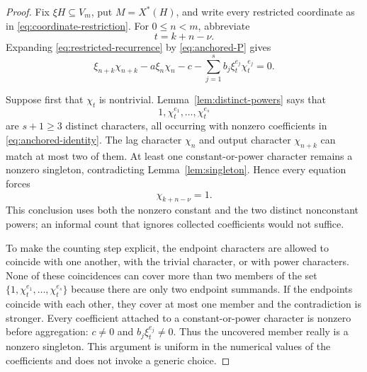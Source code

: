 \documentclass[11pt]{article}
\theoremstyle{definition}
\theoremstyle{remark}
\begin{document}
\begin{proof}
Fix $\xi H\subseteq V_m$, put $M=X^*(H)$, and write every restricted coordinate as in \eqref{eq:coordinate-restriction}.  For $0\leq n<m$, abbreviate
\[
t=k+n-\nu.
\]
Expanding \eqref{eq:restricted-recurrence} by \eqref{eq:anchored-P} gives
\begin{equation}
\xi_{n+k}\chi_{n+k}-a\xi_n\chi_n-c
-\sum_{j=1}^s b_j\xi_t^{e_j}\chi_t^{e_j}=0.
\label{eq:anchored-identity}
\end{equation}

Suppose first that $\chi_t$ is nontrivial.  Lemma~\ref{lem:distinct-powers} says that
\[
1,\chi_t^{e_1},\ldots,\chi_t^{e_s}
\]
are $s+1\geq3$ distinct characters, all occurring with nonzero coefficients in \eqref{eq:anchored-identity}.  The lag character $\chi_n$ and output character $\chi_{n+k}$ can match at most two of them.  At least one constant-or-power character remains a nonzero singleton, contradicting Lemma~\ref{lem:singleton}.  Hence every equation forces
\begin{equation}
\chi_{k+n-\nu}=1.
\label{eq:middle-trivial}
\end{equation}
This conclusion uses both the nonzero constant and the two distinct nonconstant powers; an informal count that ignores collected coefficients would not suffice.

To make the counting step explicit, the endpoint characters are allowed to
coincide with one another, with the trivial character, or with power
characters.  None of these coincidences can cover more than two members of
the set
$\{1,\chi_t^{e_1},\ldots,\chi_t^{e_s}\}$ because there are only two endpoint
summands.  If the endpoints coincide with each other, they cover at most one
member and the contradiction is stronger.  Every coefficient attached to a
constant-or-power character is nonzero before aggregation: $c\neq0$ and
$b_j\xi_t^{e_j}\neq0$.  Thus the uncovered member really is a nonzero
singleton.  This argument is uniform in the numerical values of the
coefficients and does not invoke a generic choice.


\end{proof}
\end{document}
